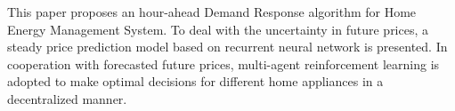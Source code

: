 This paper proposes an hour-ahead Demand Response algorithm for Home Energy Management System. To deal with the uncertainty in future prices, a steady price prediction model based on recurrent neural network is presented.
In cooperation with forecasted future prices, multi-agent reinforcement learning is adopted to make optimal decisions for different home appliances in a decentralized manner. 